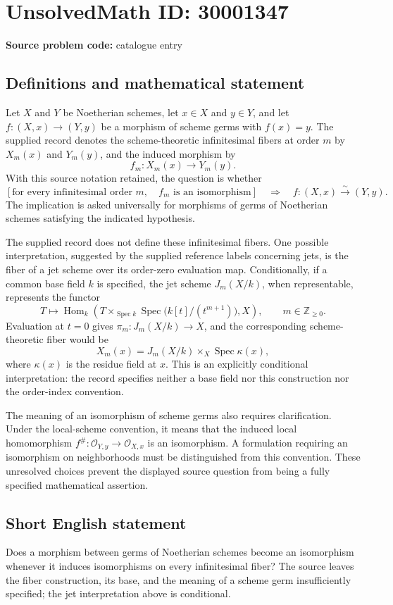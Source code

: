 \documentclass[11pt]{article}
\newcommand{\Z}{\mathbb{Z}}
\begin{document}
\section*{UnsolvedMath ID: 30001347}
\textbf{Source problem code:} catalogue entry
\subsection{Definitions and mathematical statement}
Let \(X\) and \(Y\) be Noetherian schemes, let \(x\in X\) and \(y\in Y\), and let \(f:(X,x)\to(Y,y)\) be a morphism of scheme germs with \(f(x)=y\). The supplied record denotes the scheme-theoretic infinitesimal fibers at order \(m\) by \(X_m(x)\) and \(Y_m(y)\), and the induced morphism by
\[
f_m:X_m(x)\longrightarrow Y_m(y).
\]
With this source notation retained, the question is whether
\[
\left[\text{for every infinitesimal order }m,\quad f_m\text{ is an isomorphism}\right]
\quad\Longrightarrow\quad
f:(X,x)\xrightarrow{\sim}(Y,y).
\]
The implication is asked universally for morphisms of germs of Noetherian schemes satisfying the indicated hypothesis.

The supplied record does not define these infinitesimal fibers. One possible interpretation, suggested by the supplied reference labels concerning jets, is the fiber of a jet scheme over its order-zero evaluation map. Conditionally, if a common base field \(k\) is specified, the jet scheme \(J_m(X/k)\), when representable, represents the functor
\[
T\longmapsto\operatorname{Hom}_k\!\left(T\times_{\operatorname{Spec}k}\operatorname{Spec}\bigl(k[t]/(t^{m+1})\bigr),X\right),
\qquad m\in\Z_{\geq 0}.
\]
Evaluation at \(t=0\) gives \(\pi_m:J_m(X/k)\to X\), and the corresponding scheme-theoretic fiber would be
\[
X_m(x)=J_m(X/k)\times_X\operatorname{Spec}\kappa(x),
\]
where \(\kappa(x)\) is the residue field at \(x\). This is an explicitly conditional interpretation: the record specifies neither a base field nor this construction nor the order-index convention.

The meaning of an isomorphism of scheme germs also requires clarification. Under the local-scheme convention, it means that the induced local homomorphism \(f^\#: \mathcal O_{Y,y}\to\mathcal O_{X,x}\) is an isomorphism. A formulation requiring an isomorphism on neighborhoods must be distinguished from this convention. These unresolved choices prevent the displayed source question from being a fully specified mathematical assertion.
\subsection{Short English statement}
Does a morphism between germs of Noetherian schemes become an isomorphism whenever it induces isomorphisms on every infinitesimal fiber? The source leaves the fiber construction, its base, and the meaning of a scheme germ insufficiently specified; the jet interpretation above is conditional.
\end{document}
